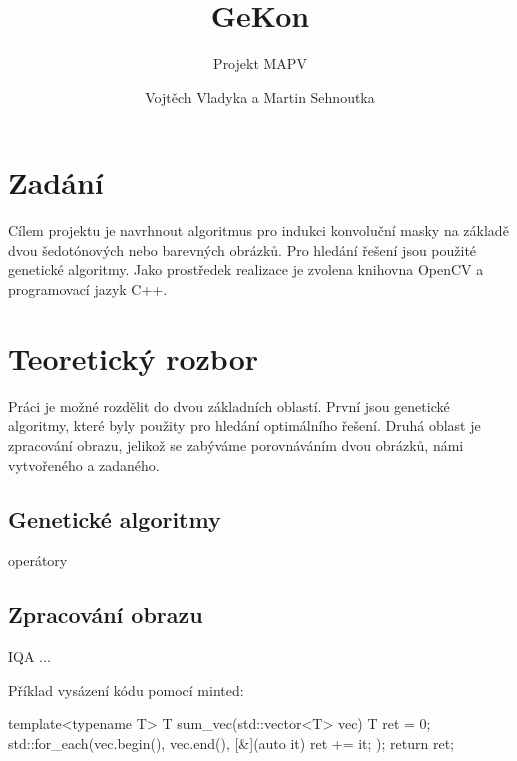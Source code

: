 \documentclass[a4paper,11pt]{scrartcl}
\title{GeKon}
\subtitle{Projekt MAPV}
\author{Vojtěch Vladyka a Martin Sehnoutka}
\begin{document}
\maketitle

\section{Zadání}
Cílem projektu je navrhnout algoritmus pro indukci konvoluční masky na základě dvou šedotónových nebo barevných obrázků. Pro hledání řešení jsou použité genetické algoritmy. Jako prostředek realizace je zvolena knihovna OpenCV a programovací jazyk C++.

\section{Teoretický rozbor}

Práci je možné rozdělit do dvou základních oblastí. První jsou genetické algoritmy, které byly použity pro hledání optimálního řešení. Druhá oblast je zpracování obrazu, jelikož se zabýváme porovnáváním dvou obrázků, námi vytvořeného a zadaného.

\subsection{Genetické algoritmy}

operátory

\subsection{Zpracování obrazu}

IQA ...

Příklad vysázení kódu pomocí minted:
\begin{cppcode}
template<typename T>
T sum_vec(std::vector<T> vec) {
    T ret = 0;
    std::for_each(vec.begin(), vec.end(), [&](auto it) { ret += it; });
    return ret;
}
\end{cppcode}
\end{document}
